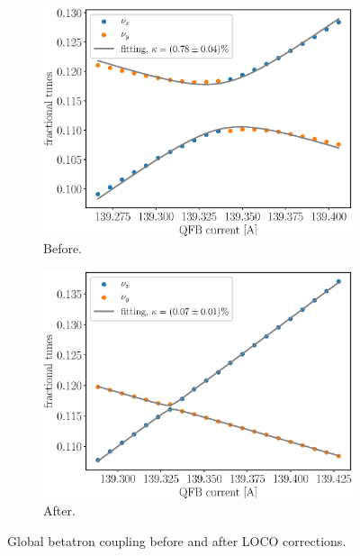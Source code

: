 \begin{figure}
\centering
\begin{subfigure}[t]{0.49\textwidth}
\includegraphics[width=1.0\textwidth]{figures/coupling_before_loco.eps}
    \caption{Before.}
    \label{subfig:coup_before}
\end{subfigure}
 \begin{subfigure}[t]{0.49\textwidth}
\includegraphics[width=1.0\textwidth]{figures/coupling_after_loco.eps}
    \caption{After.}
    \label{subfig:coup_after}
\end{subfigure}
\caption{Global betatron coupling before and after LOCO corrections.}
\label{fig:global_coupling}
\end{figure}

